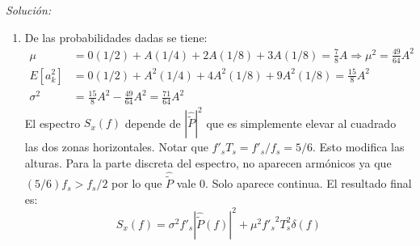 \documentclass[a4paper,11pt]{article}
\newenvironment{solucion}[1][]{
\noindent \large \textsl{Solución:} \ifthenelse{\equal{#1}{}}{}{\emph{(#1)}}

\smallskip
}{
\bigskip
}
\begin{document}
\begin{solucion}
\begin{enumerate}
                \item De las probabilidades dadas se tiene:
                \begin{align*}
                        \mu &= 0 (1/2) + A (1/4) + 2A (1/8) + 3A (1/8) = \frac{7}{8}A  \Rightarrow \mu^2 = \frac{49}{64}A^2\\
                        E[a_k^2] &= 0 (1/2) + A^2 (1/4) + 4A^2 (1/8) + 9A^2 (1/8) = \frac{15}{8}A^2\\
                        \sigma^2 &= \frac{15}{8}A^2 - \frac{49}{64}A^2 = \frac{71}{64}A^2
                \end{align*}
                El espectro $S_x(f)$ depende de $|\hat{\tilde{P}}|^2$ que es simplemente elevar al cuadrado las dos zonas horizontales. Notar que $f'_s T_s = f'_s/f_s = 5/6$. Esto modifica las alturas. Para la parte discreta del espectro, no aparecen armónicos ya que $(5/6)f_s > f_s/2$ por lo que $\hat{\tilde{P}}$ vale $0$. Solo aparece continua. El resultado final es:
                \begin{equation*}
                        S_x(f) = \sigma^2 f'_s |\hat{\tilde{P}}(f)|^2 + \mu^2 {f'_s}^2 T_s^2\delta(f)
                \end{equation*}

                \begin{center}
                \end{center}


\end{enumerate}
\end{solucion}
\end{document}
